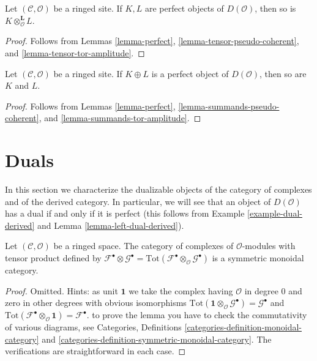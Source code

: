 \begin{lemma}
\label{lemma-tensor-perfect}
Let $(\mathcal{C}, \mathcal{O})$ be a ringed site.
If $K, L$ are perfect objects of $D(\mathcal{O})$, then
so is $K \otimes_\mathcal{O}^\mathbf{L} L$.
\end{lemma}

\begin{proof}
Follows from
Lemmas \ref{lemma-perfect}, \ref{lemma-tensor-pseudo-coherent}, and
\ref{lemma-tensor-tor-amplitude}.
\end{proof}

\begin{lemma}
\label{lemma-summands-perfect}
Let $(\mathcal{C}, \mathcal{O})$ be a ringed site.
If $K \oplus L$ is a perfect object of $D(\mathcal{O})$, then
so are $K$ and $L$.
\end{lemma}

\begin{proof}
Follows from
Lemmas \ref{lemma-perfect}, \ref{lemma-summands-pseudo-coherent}, and
\ref{lemma-summands-tor-amplitude}.
\end{proof}














\section{Duals}
\label{section-duals}

\noindent
In this section we characterize the dualizable objects of
the category of complexes and of the derived category.
In particular, we will see that an object of $D(\mathcal{O})$
has a dual if and only if it is perfect (this follows from
Example \ref{example-dual-derived} and Lemma \ref{lemma-left-dual-derived}).

\begin{lemma}
\label{lemma-symmetric-monoidal-cat-complexes}
Let $(\mathcal{C}, \mathcal{O})$ be a ringed space. The category of complexes
of $\mathcal{O}$-modules with tensor product defined by
$\mathcal{F}^\bullet \otimes \mathcal{G}^\bullet =
\text{Tot}(\mathcal{F}^\bullet \otimes_\mathcal{O} \mathcal{G}^\bullet)$
is a symmetric monoidal category.
\end{lemma}

\begin{proof}
Omitted. Hints: as unit $\mathbf{1}$ we take the complex having
$\mathcal{O}$ in degree $0$ and zero in other degrees with
obvious isomorphisms
$\text{Tot}(\mathbf{1} \otimes_\mathcal{O} \mathcal{G}^\bullet) =
\mathcal{G}^\bullet$ and
$\text{Tot}(\mathcal{F}^\bullet \otimes_\mathcal{O} \mathbf{1}) =
\mathcal{F}^\bullet$.
to prove the lemma you have to check the commutativity
of various diagrams, see Categories, Definitions
\ref{categories-definition-monoidal-category} and
\ref{categories-definition-symmetric-monoidal-category}.
The verifications are straightforward in each case.
\end{proof}

